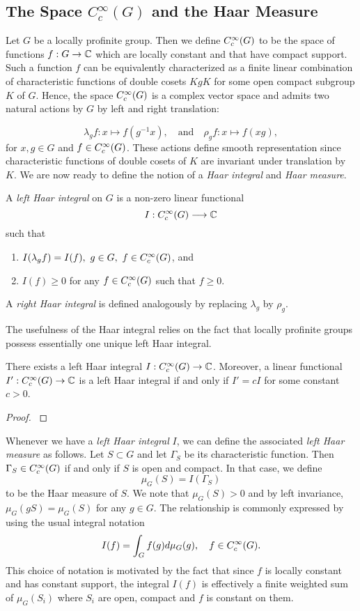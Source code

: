 \subsection{The Space \texorpdfstring{$C_c^{\infty}(G)$}{TEXT} and the Haar Measure}

Let $G$ be a locally profinite group. Then we define $C_c^{\infty}(G)$ to be the space of functions $f:G\to\mathbb{C}$ which are locally constant and that have compact support. Such a function $f$ can be equivalently characterized as a finite linear combination of characteristic functions of double cosets $KgK$ for some open compact subgroup $K$ of $G$. Hence, the space $C_c^{\infty}(G)$ is a complex vector space and admits two natural actions by $G$ by left and right translation:

$$\lambda_g f:x\longmapsto f(g^{-1}x),\quad\text{and}\quad \rho_g f:x\longmapsto f(xg),$$
for $x,g\in G$ and $f\in C_c^{\infty}(G)$. These actions define smooth representation since characteristic functions of double cosets of $K$ are invariant under translation by $K$. We are now ready to define the notion of a \textit{Haar integral} and \textit{Haar measure}.

\begin{defn}
    A \textit{left Haar integral} on $G$ is a non-zero linear functional 
    $$I:C_c^{\infty}(G)\longrightarrow \mathbb{C}$$
    such that
    \begin{enumerate}[(1)]
        \item $I(\lambda_g f)=I(f),\ g\in G,\ f\in\CG$, and
        \item $I(f)\geq 0$ for any $f\in C_c^{\infty}(G)$ such that $f\geq 0$.
    \end{enumerate}
    A \textit{right Haar integral} is defined analogously by replacing $\lambda_g$ by $\rho_g$.
\end{defn}

The usefulness of the Haar integral relies on the fact that locally profinite groups possess essentially one unique left Haar integral.

\begin{prop}\label{prop:haar}
    There exists a left Haar integral $I:C_c^{\infty}(G)\to\mathbb{C}$. Moreover, a linear functional $I':C_c^{\infty}(G)\to\mathbb{C}$ is a left Haar integral if and only if $I'=cI$ for some constant $c>0$.
\end{prop}
\begin{proof}
    \cite[3.1 Proposition]{BH1}
\end{proof}

Whenever we have a \textit{left Haar integral} $I$, we can define the associated \textit{left Haar measure} as follows. Let $S\subset G$ and let $\Gamma_S$ be its characteristic function. Then $\Gamma_S\in C_c^{\infty}(G)$ if and only if $S$ is open and compact. In that case, we define $$\mu_G(S)=I(\Gamma_S)$$ to be the Haar measure of $S$. We note that $\mu_G(S)>0$ and by left invariance, $\mu_G(gS)=\mu_G(S)$ for any $g\in G$. The relationship is commonly expressed by using the usual integral notation
$$I(f)=\int_G f(g)d\mu_G(g),\quad f\in C_c^{\infty}(G).$$
This choice of notation is motivated by the fact that since $f$ is locally constant and has constant support, the integral $I(f)$ is effectively a finite weighted sum of $\mu_G(S_i)$ where $S_i$ are open, compact and $f$ is constant on them. 


